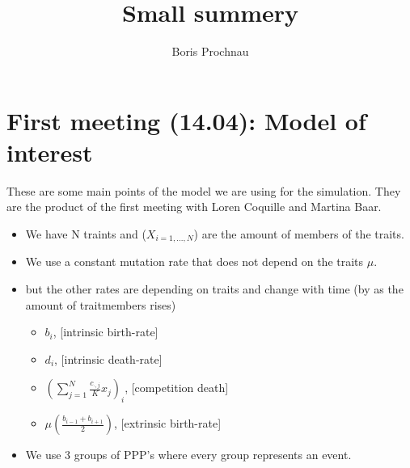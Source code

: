 \documentclass{article}
\title{Small summery}
\author{Boris Prochnau}
\begin{document}
\maketitle
\tableofcontents
\section{First meeting (14.04): Model of interest}
These are some main points of the model we are using for the simulation. They are the product of the first meeting with Loren Coquille and Martina Baar.
\begin{itemize}
	\item We have N traints and ($X_{i=1,...,N}$) are the amount of members of the traits. 
	\item We use a constant mutation rate that does not depend on the traits $\mu$.
	\item but the other rates are depending on traits and change with time (by as the amount of traitmembers rises)
		\begin{itemize}
			\item $b_i$, [intrinsic birth-rate]
			\item $d_i$, [intrinsic death-rate]
			\item $\left(\sum_{j=1}^N \frac{c_{\cdot,j}}{K}x_j\right)_i$, [competition death]
			\item $\mu\left(\frac{b_{i-1} + b_{i+1}}{2}\right)$, [extrinsic birth-rate]
		\end{itemize}
	\item We use 3 groups of PPP's where every group represents an event. 
		

\end{itemize}
\end{document}
